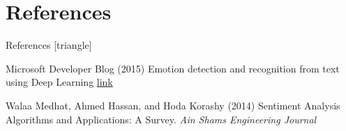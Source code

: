 \documentclass[xcolor=dvipsnames]{beamer}
\begin{document}

\section{References}
\begin{frame}{References}
[triangle]
 \begin{thebibliography}{99} %
 Microsoft Developer Blog (2015)
\newblock Emotion detection and recognition from text using Deep Learning
\newblock \href{https://www.microsoft.com/developerblog/2015/11/29/emotion-detection-and-recognition-from-text-using-deep-learning/}{link}

 Walaa Medhat, Ahmed Hassan, and Hoda Korashy (2014)
\newblock Sentiment Analysis Algorithms and Applications: A Survey.
\newblock \emph{Ain Shams Engineering Journal}

\end{thebibliography}

\end{frame}
\end{document}
